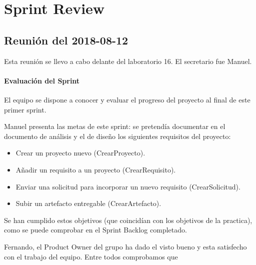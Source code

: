 \documentclass[a4paper, 12pt, spanish]{memoria}
\begin{document}
\section*{Sprint Review}

\subsection*{Reunión del 2018-08-12}
Esta reunión se llevo a cabo delante del laboratorio 16. El secretario fue Manuel.

\paragraph{Evaluación del Sprint}
El equipo se dispone a conocer y evaluar el progreso del proyecto al final de este primer sprint.

Manuel presenta las metas de este sprint: se pretendía documentar en el documento de análisis y el de diseño los siguientes requisitos del proyecto:
\begin{itemize}
	\item Crear un proyecto nuevo (CrearProyecto).
	\item Añadir un requisito a un proyecto (CrearRequisito).
	\item Enviar una solicitud para incorporar un nuevo requisito (CrearSolicitud).
	\item Subir un artefacto entregable (CrearArtefacto).
\end{itemize}
Se han cumplido estos objetivos (que coincidían con los objetivos de la practica),
como se puede comprobar en el Sprint Backlog completado.

Fernando, el Product Owner del grupo ha dado el visto bueno y esta satisfecho con el trabajo del equipo. Entre todos comprobamos que 


\end{document}
